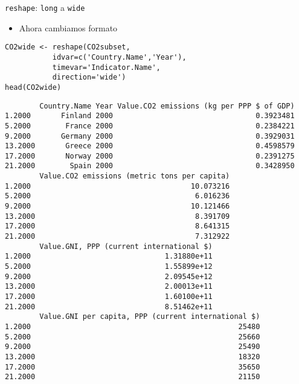 \documentclass[xcolor={usenames,svgnames,dvipsnames}]{beamer}
\begin{document}
\begin{frame}[fragile,label=sec-4-6]{\texttt{reshape}: \texttt{long} a \texttt{wide}}
 \begin{itemize}
\item Ahora cambiamos formato
\end{itemize}
\lstset{language=R,numbers=none}
\begin{lstlisting}
CO2wide <- reshape(CO2subset,
		   idvar=c('Country.Name','Year'),
		   timevar='Indicator.Name',
		   direction='wide')
head(CO2wide)
\end{lstlisting}

\begin{verbatim}
        Country.Name Year Value.CO2 emissions (kg per PPP $ of GDP)
1.2000       Finland 2000                                 0.3923481
5.2000        France 2000                                 0.2384221
9.2000       Germany 2000                                 0.3929031
13.2000       Greece 2000                                 0.4598579
17.2000       Norway 2000                                 0.2391275
21.2000        Spain 2000                                 0.3428950
        Value.CO2 emissions (metric tons per capita)
1.2000                                     10.073216
5.2000                                      6.016236
9.2000                                     10.121466
13.2000                                     8.391709
17.2000                                     8.641315
21.2000                                     7.312922
        Value.GNI, PPP (current international $)
1.2000                               1.31880e+11
5.2000                               1.55899e+12
9.2000                               2.09545e+12
13.2000                              2.00013e+11
17.2000                              1.60100e+11
21.2000                              8.51462e+11
        Value.GNI per capita, PPP (current international $)
1.2000                                                25480
5.2000                                                25660
9.2000                                                25490
13.2000                                               18320
17.2000                                               35650
21.2000                                               21150
\end{verbatim}
\end{frame}
\end{document}
